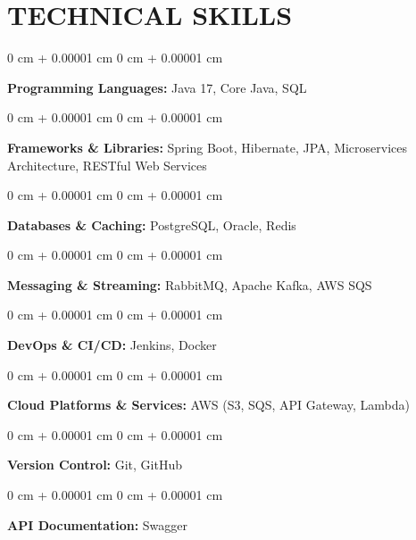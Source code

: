 \documentclass[10pt, letterpaper]{article}
\newenvironment{onecolentry}{
    \begin{adjustwidth}{
        0 cm + 0.00001 cm
    }{
        0 cm + 0.00001 cm
    }
}{
    \end{adjustwidth}
} %
\begin{document}

    \vspace{0.1 cm}
    \section{TECHNICAL SKILLS}
    \vspace{0.1 cm}

        \begin{onecolentry}
            \textbf{\textbf{Programming Languages:} } Java 17, Core Java, SQL \end{onecolentry}
        \vspace{0.1 cm}
        \begin{onecolentry}
            \textbf{Frameworks \& Libraries:} Spring Boot, Hibernate, JPA, Microservices Architecture, RESTful Web Services \end{onecolentry}
        \vspace{0.1 cm}
        \begin{onecolentry}
            \textbf{\textbf{Databases \& Caching:} } PostgreSQL, Oracle, Redis \end{onecolentry}
        \vspace{0.1 cm}
        \begin{onecolentry}
        \textbf{Messaging \& Streaming:} RabbitMQ, Apache Kafka, AWS SQS \end{onecolentry}
        \vspace{0.1 cm}
        \begin{onecolentry}
        \textbf{DevOps \& CI/CD:} Jenkins, Docker  \end{onecolentry}
        \vspace{0.1 cm}
        \begin{onecolentry}
         \textbf{Cloud Platforms \& Services:}  AWS (S3, SQS, API Gateway, Lambda)
        \end{onecolentry}
        \vspace{0.1 cm}
        \begin{onecolentry}
         \textbf{Version Control:}  Git, GitHub
        \end{onecolentry}
        \vspace{0.1 cm}
        \begin{onecolentry}
        \textbf{API Documentation:}  Swagger
        \end{onecolentry}
        \vspace{0.1 cm}
\end{document}
